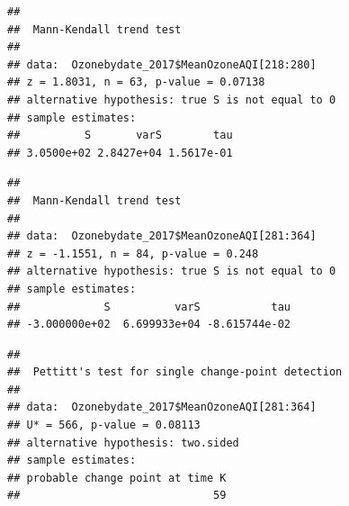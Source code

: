 \documentclass[12pt,]{article}
\newenvironment{Shaded}{\begin{snugshade}}{\end{snugshade}}
\newcommand{\KeywordTok}[1]{\textcolor[rgb]{0.13,0.29,0.53}{\textbf{#1}}}
\newcommand{\DecValTok}[1]{\textcolor[rgb]{0.00,0.00,0.81}{#1}}
\newcommand{\CommentTok}[1]{\textcolor[rgb]{0.56,0.35,0.01}{\textit{#1}}}
\newcommand{\OperatorTok}[1]{\textcolor[rgb]{0.81,0.36,0.00}{\textbf{#1}}}
\newcommand{\NormalTok}[1]{#1}
\begin{document}
\begin{Shaded}
\end{Shaded}

\begin{verbatim}
## 
##  Mann-Kendall trend test
## 
## data:  Ozonebydate_2017$MeanOzoneAQI[218:280]
## z = 1.8031, n = 63, p-value = 0.07138
## alternative hypothesis: true S is not equal to 0
## sample estimates:
##          S       varS        tau 
## 3.0500e+02 2.8427e+04 1.5617e-01
\end{verbatim}

\begin{Shaded}
\end{Shaded}

\begin{verbatim}
## 
##  Mann-Kendall trend test
## 
## data:  Ozonebydate_2017$MeanOzoneAQI[281:364]
## z = -1.1551, n = 84, p-value = 0.248
## alternative hypothesis: true S is not equal to 0
## sample estimates:
##             S          varS           tau 
## -3.000000e+02  6.699933e+04 -8.615744e-02
\end{verbatim}

\begin{Shaded}
\end{Shaded}

\begin{verbatim}
## 
##  Pettitt's test for single change-point detection
## 
## data:  Ozonebydate_2017$MeanOzoneAQI[281:364]
## U* = 566, p-value = 0.08113
## alternative hypothesis: two.sided
## sample estimates:
## probable change point at time K 
##                              59
\end{verbatim}
\end{document}
